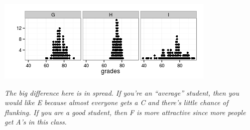 \begin{enumerate}
    \includegraphics[width=.7\linewidth]{../plots/3classGradeCompareSD.png}
\begin{students}
    \vspace{2cm}
\end{students}

\begin{key}
  {\it The big difference here is in spread.  If you're an ``average''
  student, then you would like E because almost everyone gets a C and
  there's little chance of flunking.  If you are a good student, then
  F is more attractive since more people get A's in this class.}
\end{key}



\end{enumerate}
